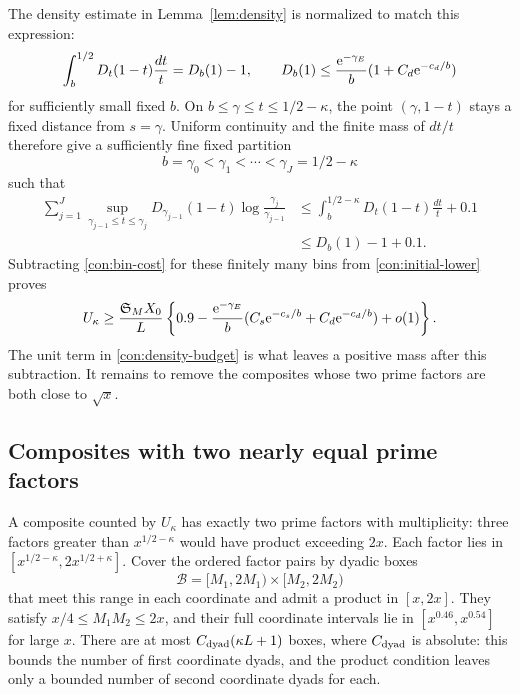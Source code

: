 The density estimate in Lemma~\ref{lem:density} is normalized to
match this expression:
\begin{equation}\label{con:density-budget}
 \int_b^{1/2}D_t(1-t)\frac{dt}{t}=D_b(1)-1,
 \qquad
 D_b(1)\le\frac{\mathrm{e}^{-\gamma_E}}b(1+C_d\mathrm{e}^{-c_d/b})
\end{equation}
for sufficiently small fixed \(b\). On
\(b\le\gamma\le t\le1/2-\kappa\), the point \((\gamma,1-t)\)
stays a fixed distance from \(s=\gamma\).  Uniform continuity and
the finite mass of \(dt/t\) therefore give a sufficiently fine
fixed partition
\[
 b=\gamma_0<\gamma_1<\cdots<\gamma_J=1/2-\kappa
\]
such that
\begin{align*}
 \sum_{j=1}^J
 \sup_{\gamma_{j-1}\le t\le\gamma_j}D_{\gamma_{j-1}}(1-t)
                         \log\frac{\gamma_j}{\gamma_{j-1}}
 &\le\int_b^{1/2-\kappa}D_t(1-t)\frac{dt}{t}+0.1\\
 &\le D_b(1)-1+0.1.
\end{align*}
Subtracting \eqref{con:bin-cost} for these finitely many bins from
\eqref{con:initial-lower} proves
\begin{equation}\label{con:post-bin}
 U_\kappa\ge\frac{\mathfrak S_M X_0}{L}
 \left\{0.9-\frac{\mathrm{e}^{-\gamma_E}}b
       (C_s\mathrm{e}^{-c_s/b}+C_d\mathrm{e}^{-c_d/b})+o(1)\right\}.
\end{equation}
The unit term in \eqref{con:density-budget} is what leaves a positive
mass after this subtraction.  It remains to remove the composites
whose two prime factors are both close to \(\sqrt x\).

\subsection{Composites with two nearly equal prime factors}

A composite counted by \(U_\kappa\) has exactly two prime factors
with multiplicity: three factors greater than \(x^{1/2-\kappa}\)
would have product exceeding \(2x\).  Each factor lies in
\([x^{1/2-\kappa},2x^{1/2+\kappa}]\).  Cover the ordered factor
pairs by dyadic boxes
\begin{equation}\label{con:boxes}
 \mathcal B=[M_1,2M_1)\times[M_2,2M_2)
\end{equation}
that meet this range in each coordinate and admit a product in
\([x,2x]\).  They satisfy \(x/4\le M_1M_2\le2x\), and their
full coordinate intervals lie in \([x^{0.46},x^{0.54}]\) for large
\(x\).  There are at most \(C_{\rm dyad}(\kappa L+1)\) boxes,
where \(C_{\rm dyad}\) is absolute: this bounds the number of first
coordinate dyads, and the product condition leaves only a bounded
number of second coordinate dyads for each.

